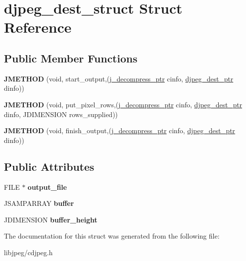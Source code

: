 \hypertarget{structdjpeg__dest__struct}{\section{djpeg\-\_\-dest\-\_\-struct Struct Reference}
\label{structdjpeg__dest__struct}
}
\subsection*{Public Member Functions}
\begin{DoxyCompactItemize}
\item 
\hypertarget{structdjpeg__dest__struct_a387aad15333be251b9fdd4f341e3b50c}{{\bfseries J\-M\-E\-T\-H\-O\-D} (void, start\-\_\-output,(\hyperlink{structjpeg__decompress__struct}{j\-\_\-decompress\-\_\-ptr} cinfo, \hyperlink{structdjpeg__dest__struct}{djpeg\-\_\-dest\-\_\-ptr} dinfo))}\label{structdjpeg__dest__struct_a387aad15333be251b9fdd4f341e3b50c}

\item 
\hypertarget{structdjpeg__dest__struct_ab7452265598106468aeb73b63c080024}{{\bfseries J\-M\-E\-T\-H\-O\-D} (void, put\-\_\-pixel\-\_\-rows,(\hyperlink{structjpeg__decompress__struct}{j\-\_\-decompress\-\_\-ptr} cinfo, \hyperlink{structdjpeg__dest__struct}{djpeg\-\_\-dest\-\_\-ptr} dinfo, J\-D\-I\-M\-E\-N\-S\-I\-O\-N rows\-\_\-supplied))}\label{structdjpeg__dest__struct_ab7452265598106468aeb73b63c080024}

\item 
\hypertarget{structdjpeg__dest__struct_a3a1f7c965ea1dbbb577eb8902e3c893e}{{\bfseries J\-M\-E\-T\-H\-O\-D} (void, finish\-\_\-output,(\hyperlink{structjpeg__decompress__struct}{j\-\_\-decompress\-\_\-ptr} cinfo, \hyperlink{structdjpeg__dest__struct}{djpeg\-\_\-dest\-\_\-ptr} dinfo))}\label{structdjpeg__dest__struct_a3a1f7c965ea1dbbb577eb8902e3c893e}

\end{DoxyCompactItemize}
\subsection*{Public Attributes}
\begin{DoxyCompactItemize}
\item 
\hypertarget{structdjpeg__dest__struct_a5cd2d9d83c2b0b77b30169be5682d8fc}{F\-I\-L\-E $\ast$ {\bfseries output\-\_\-file}}\label{structdjpeg__dest__struct_a5cd2d9d83c2b0b77b30169be5682d8fc}

\item 
\hypertarget{structdjpeg__dest__struct_a84d1443492d9c70afae65d6f95410cf4}{J\-S\-A\-M\-P\-A\-R\-R\-A\-Y {\bfseries buffer}}\label{structdjpeg__dest__struct_a84d1443492d9c70afae65d6f95410cf4}

\item 
\hypertarget{structdjpeg__dest__struct_a78eef05ab5286600c995e9df51acf2c1}{J\-D\-I\-M\-E\-N\-S\-I\-O\-N {\bfseries buffer\-\_\-height}}\label{structdjpeg__dest__struct_a78eef05ab5286600c995e9df51acf2c1}

\end{DoxyCompactItemize}


The documentation for this struct was generated from the following file\-:\begin{DoxyCompactItemize}
\item 
libjpeg/cdjpeg.\-h\end{DoxyCompactItemize}
